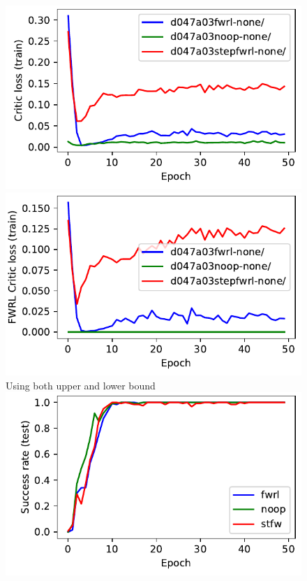 \begin{figure}
  \includegraphics[width=\frac\columnwidth]{media/res/d047a03-FetchReach-v1-stepfwrl-none/train/critic_loss.pdf}%
  \includegraphics[width=\frac\columnwidth]{media/res/d047a03-FetchReach-v1-stepfwrl-none/train/critic_addnl_loss.pdf}\\
Using both upper and lower bound\\
  \includegraphics[width=\frac\columnwidth]{media/res/f0d4cfa-FetchReach-v1-stfw-none/test/success_rate.pdf}%

\end{figure}
